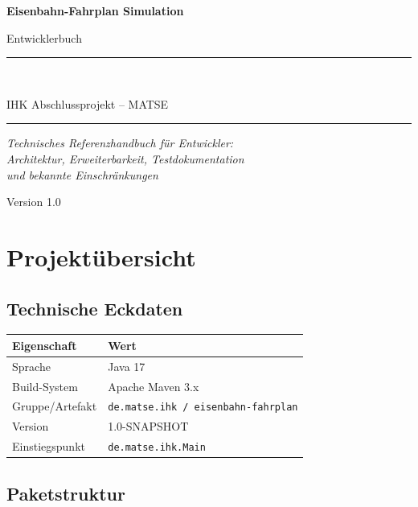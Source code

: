 \documentclass[12pt,a4paper]{article}
\begin{document}
\begin{titlepage}
    \centering
    \vspace*{2cm}
    {\Huge\bfseries Eisenbahn-Fahrplan Simulation\par}
    \vspace{0.5cm}
    {\Large Entwicklerbuch\par}
    \vspace{2cm}
    \rule{\linewidth}{0.4pt}\\[0.5cm]
    {\large IHK Abschlussprojekt -- MATSE\par}
    \rule{\linewidth}{0.4pt}
    \vspace{2cm}
    {\large\itshape Technisches Referenzhandbuch für Entwickler:\\
    Architektur, Erweiterbarkeit, Testdokumentation\\
    und bekannte Einschränkungen\par}
    \vfill
    {\large Version 1.0 \par}
\end{titlepage}

\tableofcontents
\newpage

\section{Projektübersicht}

\subsection{Technische Eckdaten}

\begin{center}
\begin{tabular}{ll}
\toprule
\textbf{Eigenschaft} & \textbf{Wert} \\
\midrule
Sprache & Java 17 \\
Build-System & Apache Maven 3.x \\
Gruppe/Artefakt & \texttt{de.matse.ihk / eisenbahn-fahrplan} \\
Version & 1.0-SNAPSHOT \\
Einstiegspunkt & \texttt{de.matse.ihk.Main} \\
\bottomrule
\end{tabular}
\end{center}

\subsection{Paketstruktur}
\end{document}
